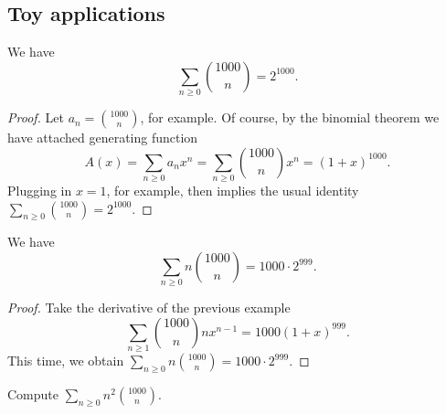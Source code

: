 \documentclass[11pt]{scrartcl}
\begin{document}
\subsection{Toy applications}
\begin{example}
  We have
  \[ \sum_{n \ge 0} \binom{1000}{n} = 2^{1000}. \]
\end{example}
\begin{proof}
  Let $a_n = \binom{1000}{n}$, for example.
  Of course, by the binomial theorem we have attached generating function
  \[ A(x) = \sum_{n \ge 0} a_n x^n
    = \sum_{n \ge 0} \binom{1000}{n} x^n
    = (1+x)^{1000}. \]
  Plugging in $x=1$, for example, then implies the usual identity
  $\sum_{n \ge 0} \binom{1000}{n} = 2^{1000}$.
\end{proof}
\begin{example}
  We have
  \[ \sum_{n \ge 0} n\binom{1000}{n} = 1000 \cdot 2^{999}. \]
\end{example}
\begin{proof}
  Take the derivative of the previous example
  \[ \sum_{n \ge 1} \binom{1000}{n} n x^{n-1}
    = 1000 (1+x)^{999}. \]
  This time, we obtain
  $\sum_{n \ge 0} n \binom{1000}{n} = 1000 \cdot 2^{999}$.
\end{proof}
\begin{exercise}
  Compute $\sum_{n \ge 0} n^2\binom{1000}{n}$. %
\end{exercise}
\end{document}
